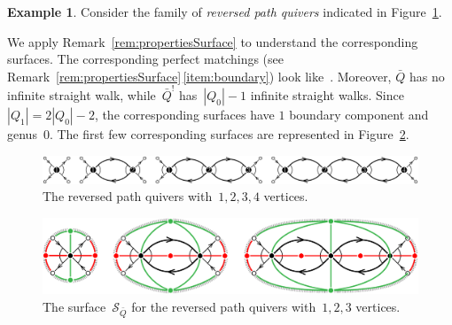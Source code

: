 \documentclass{amsart}
\theoremstyle{definition}
\newtheorem{example}[theorem]{Example}
\newcommand{\fref}[1]{Figure~\ref{#1}} %
\newcommand{\darkblue}{\color{darkblue}} %
\newcommand{\defn}[1]{\textsl{\darkblue #1}} %
\newcommand{\surface}{\mathcal{S}} %
\newcommand{\koszul}{^!} %
\begin{document}
\begin{example}
\label{exm:reversedPath}
Consider the family of \defn{reversed path quivers} indicated in \fref{fig:reversedPathsQuivers}.

We apply Remark~\ref{rem:propertiesSurface} to understand the corresponding surfaces.
The corresponding perfect matchings (see Remark~\ref{rem:propertiesSurface}\,\eqref{item:boundary}) look like~.
Moreover, $\bar Q$ has no infinite straight walk, while~$\bar Q\koszul$ has~$|Q_0|-1$ infinite straight walks.
Since~$|Q_1| = 2|Q_0|-2$, the corresponding surfaces have $1$ boundary component and genus~$0$.
The first few corresponding surfaces are represented in \fref{fig:reversedPathsSurfaces}.

\begin{figure}[h]
	\capstart
	\centerline{\includegraphics[scale=.45]{reversedPathsQuivers}}
	\caption{The reversed path quivers with~$1, 2, 3, 4$ vertices.}
	\label{fig:reversedPathsQuivers}
\end{figure}

\begin{figure}[h]
	\capstart
	\centerline{\includegraphics[scale=.7]{reversedPathsSurfaces3}}
	\caption{The surface~$\surface_{\bar Q}$ for the reversed path quivers with~$1, 2, 3$ vertices.}
	\label{fig:reversedPathsSurfaces}
\end{figure}
\end{example}
\end{document}
